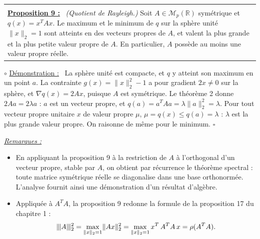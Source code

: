 \documentclass[a4paper,twoside]{report}
\makeatletter
\newenvironment{cadre}%
 {\par\vspace{2mm}\noindent\begin{tabular}{|@{\hspace{4mm}}p{0.93\textwidth}@{\hspace{4mm}}|}
  \hline \\[-2mm]}%
 {\\[2mm] \hline \end{tabular}\par\vspace{3mm}}
\newcommand{\propo}[1]{\textbf{\underline{Proposition #1 :}}~}
\newenvironment{demo}%
 {\par\needspace{4\baselineskip}\vspace{1mm}\noindent$\circ$ \underline{Démonstration :}~\setlength{\parskip}{3pt plus 1pt}}%
 {\hfill$\square$\par\vspace{2mm}}
\newenvironment{remarques}%
 {\par\needspace{6\baselineskip}\vspace{1mm}\begin{list}{}{\leftmargin=1cm \rightmargin=0.5cm}\item[]%
  \textit{\underline{Remarques :}}%
  \begin{itemize}[label=$\bullet$,leftmargin=0.45cm,topsep=3pt,itemsep=4pt]}%
 {\end{itemize}\end{list}\vspace{1mm}}
\newcommand{\R}{\mathbb{R}}
\newcommand{\tra}[1]{{#1}^{T}}                    %
\newcommand{\norme}[1]{\lVert #1 \rVert}         %
\newcommand{\nop}[1]{|\mkern-1.5mu|\mkern-1.5mu|#1|\mkern-1.5mu|\mkern-1.5mu|}   %
\newcommand{\grad}{\nabla}                        %
\makeatother
\begin{document}
\begin{cadre}
\propo{9} \emph{(Quotient de Rayleigh.)} Soit $A \in \mathcal{M}_{p}(\R)$ symétrique et $q(x) = \tra{x}Ax$. Le maximum et le minimum de $q$ sur la sphère unité $\norme{x}_{2} = 1$ sont atteints en des vecteurs propres de $A$, et valent la plus grande et la plus petite valeur propre de $A$. En particulier, $A$ possède au moins une valeur propre réelle.
\end{cadre}

\begin{demo}
La sphère unité est compacte, et $q$ y atteint son maximum en un point $a$. La contrainte $g(x) = \norme{x}_{2}^{2} - 1$ a pour gradient $2x \neq 0$ sur la sphère, et $\grad q(x) = 2Ax$, puisque $A$ est symétrique. Le théorème 2 donne $2Aa = 2\lambda a$ : $a$ est un vecteur propre, et $q(a) = \tra{a}Aa = \lambda\norme{a}_{2}^{2} = \lambda$. Pour tout vecteur propre unitaire $x$ de valeur propre $\mu$, $\mu = q(x) \leqslant q(a) = \lambda$ : $\lambda$ est la plus grande valeur propre. On raisonne de même pour le minimum.
\end{demo}

\begin{remarques}
  \item En appliquant la proposition 9 à la restriction de $A$ à l'orthogonal d'un vecteur propre, stable par $A$, on obtient par récurrence le théorème spectral : toute matrice symétrique réelle se diagonalise dans une base orthonormée. L'analyse fournit ainsi une démonstration d'un résultat d'algèbre.
  \item Appliquée à $\tra{A}A$, la proposition 9 redonne la formule de la proposition 17 du chapitre 1 :
  \[ \nop{A}_{2}^{2} = \max_{\norme{x}_{2} = 1} \norme{Ax}_{2}^{2} = \max_{\norme{x}_{2} = 1} \tra{x}\,\tra{A}A\,x = \rho(\tra{A}A). \]
\end{remarques}
\end{document}
